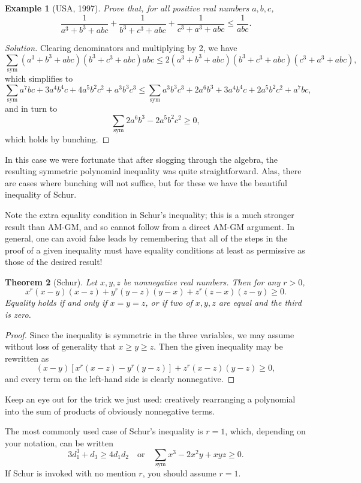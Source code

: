 \documentclass[12pt]{report}
\newtheorem{theorem}{Theorem}
\newtheorem{problem}[theorem]{Example}
\def\ssym{\sum_{\mathrm{sym}}}
\numberwithin{exc}{section}
\begin{document}
\begin{problem}[USA, 1997]
Prove that, for all positive real numbers $a,b,c$,
\[
\frac{1}{a^{3}+b^{3}+abc} + \frac{1}{b^{3}+c^{3}+abc} 
+ \frac{1}{c^{3}+a^{3}+abc} \leq \frac{1}{abc}.
\]
\end{problem}
\begin{proof}[Solution]
Clearing denominators and multiplying by 2, we have
\[
\ssym (a^{3}+b^{3}+abc)(b^{3}+c^{3}+abc)abc \leq 
2(a^{3}+b^{3}+abc)(b^{3}+c^{3}+abc)(c^{3}+a^{3}+abc),
\]
which simplifies to
\[
\ssym a^{7}bc + 3 a^{4}b^{4}c + 4 a^{5}b^{2}c^{2} + a^{3}b^{3}c^{3}
\leq \ssym a^{3}b^{3}c^{3} + 2 a^{6}b^{3} + 3  a^{4}b^{4}c + 
2a^{5}b^{2}c^{2} + a^{7}bc,
\]
and in turn to
\[
\ssym 2 a^{6}b^{3} - 2 a^{5}b^{2}c^{2} \geq 0,
\]
which holds by bunching.
\end{proof}

In this case we were fortunate that after slogging through the 
algebra, the resulting symmetric polynomial inequality was quite 
straightforward. Alas, there are cases where bunching will not 
suffice, but for these we have the beautiful inequality of Schur.

Note the extra equality condition in Schur's inequality; this
is a much stronger result than AM-GM, and so cannot follow from
a direct AM-GM argument. In general, one can avoid false leads by
remembering that all of the steps in the proof of a given inequality
must have equality conditions at least as permissive as those of
the desired result!
\begin{theorem}[Schur]
Let $x, y, z$ be nonnegative real numbers. Then for any $r>0$,
\[
x^{r} (x-y)(x-z) + y^{r}(y-z)(y-x) + z^{r}(z-x)(z-y) \geq 0.
\]
Equality holds if and only if $x=y=z$, or if two of $x,y,z$ are
equal and the third is zero.
\end{theorem}
\begin{proof}
Since the inequality is symmetric in the three variables, we may 
assume without loss of generality that $x \geq y \geq z$. Then the 
given inequality may be rewritten as
\[
(x-y)[x^{r}(x-z) - y^{r}(y-z)] + z^{r}(x-z)(y-z) \geq 0,
\]
and every term on the left-hand side is clearly nonnegative.
\end{proof}
Keep an eye out for the trick we just used: creatively rearranging a 
polynomial into the sum of products of obviously nonnegative terms.

The most commonly used case of Schur's inequality is $r=1$, which, 
depending on your notation, can be written
\[
3d_{1}^{3} + d_{3} \geq 4d_{1}d_{2} \quad \mbox{or} \quad
\ssym x^{3} - 2x^{2}y + xyz \geq 0.
\]
If Schur is invoked with no mention $r$, you should assume $r=1$.
\end{document}
